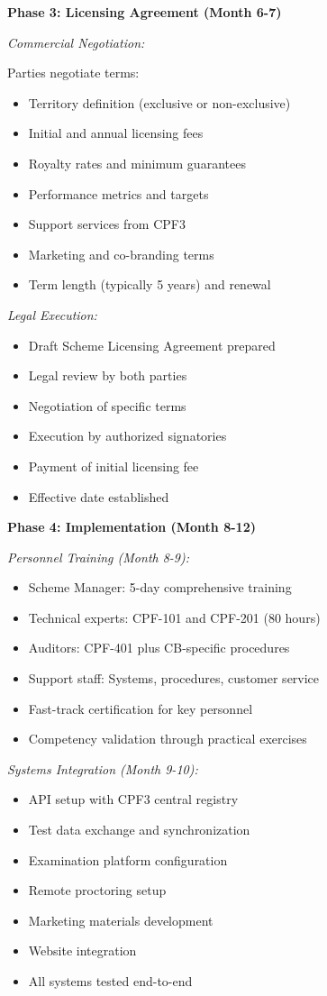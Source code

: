 \documentclass[11pt,a4paper]{article}
\begin{document}
\textbf{Phase 3: Licensing Agreement (Month 6-7)}

\textit{Commercial Negotiation:}

Parties negotiate terms:
\begin{itemize}
\item Territory definition (exclusive or non-exclusive)
\item Initial and annual licensing fees
\item Royalty rates and minimum guarantees
\item Performance metrics and targets
\item Support services from CPF3
\item Marketing and co-branding terms
\item Term length (typically 5 years) and renewal
\end{itemize}

\textit{Legal Execution:}

\begin{itemize}
\item Draft Scheme Licensing Agreement prepared
\item Legal review by both parties
\item Negotiation of specific terms
\item Execution by authorized signatories
\item Payment of initial licensing fee
\item Effective date established
\end{itemize}

\textbf{Phase 4: Implementation (Month 8-12)}

\textit{Personnel Training (Month 8-9):}

\begin{itemize}
\item Scheme Manager: 5-day comprehensive training
\item Technical experts: CPF-101 and CPF-201 (80 hours)
\item Auditors: CPF-401 plus CB-specific procedures
\item Support staff: Systems, procedures, customer service
\item Fast-track certification for key personnel
\item Competency validation through practical exercises
\end{itemize}

\textit{Systems Integration (Month 9-10):}

\begin{itemize}
\item API setup with CPF3 central registry
\item Test data exchange and synchronization
\item Examination platform configuration
\item Remote proctoring setup
\item Marketing materials development
\item Website integration
\item All systems tested end-to-end
\end{itemize}
\end{document}
